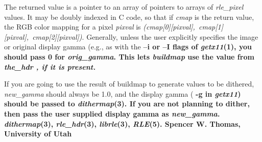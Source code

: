 The returned value is a pointer to an array of pointers to arrays of 
{\it rle\_pixel}
values.  It may be doubly indexed in C code, so that if
{\it cmap}
is the return value, the RGB color mapping for a pixel
{\it pixval}
is
{\it (cmap[0][pixval],\ cmap[1][pixval],\ cmap[2][pixval])}{\rm .}
Generally, unless the user explicitly specifies the image or original
display gamma (e.g., as with the %
\bf --i \rm%
or %
\bf --I \rm%
flags of
{\it getx11}{\rm (1),}
you should pass 0 for
{\it orig\_gamma}{\rm .}
This lets 
{\it buildmap}
use the value from %
\it the\_hdr\rm%
, if it is present.

If you are going to use the result of buildmap to generate values to
be dithered,
{\it new\_gamma}
should always be 1.0, and the display gamma (%
\bf -g \rm%
in
{\it getx11}{\rm )}
should be passed to
{\it dithermap}{\rm (3).}
If you are not planning to dither, then pass the
user supplied display gamma as 
{\it new\_gamma}{\rm .}
{\it dithermap}{\rm (3),}
{\it rle\_hdr}{\rm (3),}
{\it librle}{\rm (3),}
{\it RLE}{\rm (5).}
Spencer W. Thomas,
University of Utah

\newpage


%
%
%

